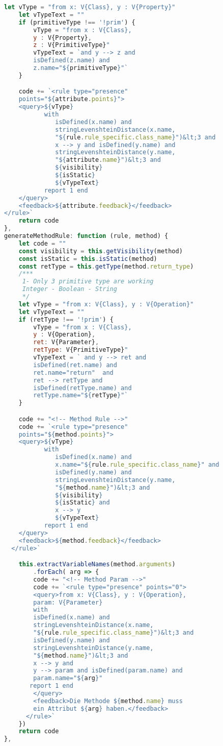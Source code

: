 \begin{lstlisting}[caption={Fall der Class Definition Rule}, label={lst:class_def_rule}, language=javascript]
    let vType = "from x: V{Class}, y : V{Property}"
    let vTypeText = ""
    if (primitiveType !== '!prim') {
        vType = "from x : V{Class},
        y : V{Property},
        z : V{PrimitiveType}"
        vTypeText = `and y --> z and
        isDefined(z.name) and
        z.name="${primitiveType}"`
    }

    code += `<rule type="presence"
    points="${attribute.points}">
    <query>${vType}
           with
              isDefined(x.name) and
              stringLevenshteinDistance(x.name,
              "${rule.rule_specific.class_name}")&lt;3 and
              x --> y and isDefined(y.name) and
              stringLevenshteinDistance(y.name,
              "${attribute.name}")&lt;3 and
              ${visibility}
              ${isStatic}
              ${vTypeText}
           report 1 end
    </query>
    <feedback>${attribute.feedback}</feedback>
</rule>`
    return code
},
generateMethodRule: function (rule, method) {
    let code = ""
    const visibility = this.getVisibility(method)
    const isStatic = this.isStatic(method)
    const retType = this.getType(method.return_type)
    /***
     1- Only 3 primitive type are working
     Integer - Boolean - String
     */
    let vType = "from x: V{Class}, y : V{Operation}"
    let vTypeText = ""
    if (retType !== '!prim') {
        vType = "from x : V{Class},
        y : V{Operation},
        ret: V{Parameter},
        retType: V{PrimitiveType}"
        vTypeText = ` and y --> ret and
        isDefined(ret.name) and
        ret.name="return"  and
        ret --> retType and
        isDefined(retType.name) and
        retType.name="${retType}"`
    }

    code += "<!-- Method Rule -->"
    code += `<rule type="presence"
    points="${method.points}">
    <query>${vType}
           with
              isDefined(x.name) and
              x.name="${rule.rule_specific.class_name}" and
              isDefined(y.name) and
              stringLevenshteinDistance(y.name,
              "${method.name}")&lt;3 and
              ${visibility}
              ${isStatic} and
              x --> y
              ${vTypeText}
           report 1 end
    </query>
    <feedback>${method.feedback}</feedback>
  </rule>`

    this.extractVariableNames(method.arguments)
        .forEach( arg => {
        code += "<!-- Method Param -->"
        code += `<rule type="presence" points="0">
        <query>from x: V{Class}, y : V{Operation},
        param: V{Parameter}
        with
        isDefined(x.name) and
        stringLevenshteinDistance(x.name,
        "${rule.rule_specific.class_name}")&lt;3 and
        isDefined(y.name) and
        stringLevenshteinDistance(y.name,
        "${method.name}")&lt;3 and
        x --> y and
        y --> param and isDefined(param.name) and
        param.name="${arg}"
       report 1 end
        </query>
        <feedback>Die Methode ${method.name} muss
        ein Attribut ${arg} haben.</feedback>
      </rule>`
    })
    return code
},


\end{lstlisting}
